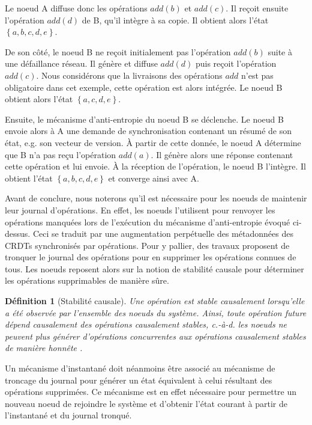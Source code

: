 \documentclass[12pt]{thesul}
\newtheorem{definition}{Définition}
\newcommand{\eg}{e.g. }
\newcommand{\ie}{c.-à-d. }
\newcommand{\trm}[1]{\mathit{#1}}
\newcommand{\set}[1]{\left\{#1\right\}} %
\begin{document}
Le noeud A diffuse donc les opérations $\trm{add}(b)$ et $\trm{add}(c)$.
Il reçoit ensuite l'opération $\trm{add}(d)$ de B, qu'il intègre à sa copie.
Il obtient alors l'état $\set{a,b,c,d,e}$.

De son côté, le noeud B ne reçoit initialement pas l'opération $\trm{add}(b)$ suite à une défaillance réseau.
Il génère et diffuse $\trm{add}(d)$ puis reçoit l'opération $\trm{add}(c)$.
Nous considérons que la livraisons des opérations $\trm{add}$ n'est pas obligatoire dans cet exemple, cette opération est alors intégrée.
Le noeud B obtient alors l'état $\set{a,c,d,e}$.

Ensuite, le mécanisme d'anti-entropie du noeud B se déclenche.
Le noeud B envoie alors à A une demande de synchronisation contenant un résumé de son état, \eg son vecteur de version.
À partir de cette donnée, le noeud A détermine que B n'a pas reçu l'opération $\trm{add}(a)$.
Il génère alors une réponse contenant cette opération et lui envoie.
À la réception de l'opération, le noeud B l'intègre.
Il obtient l'état $\set{a,b,c,d,e}$ et converge ainsi avec A.

Avant de conclure, nous noterons qu'il est nécessaire pour les noeuds de maintenir leur journal d'opérations.
En effet, les noeuds l'utilisent pour renvoyer les opérations manquées lors de l'exécution du mécanisme d'anti-entropie évoqué ci-dessus.
Ceci se traduit par une augmentation perpétuelle des métadonnées des \acp{CRDT} synchronisés par opérations.
Pour y pallier, des travaux \cite{baquero2017pure, 2021-improving-reactivity-pure-op-based-crdts-bauwens} proposent de tronquer le journal des opérations pour en supprimer les opérations connues de tous.
Les noeuds reposent alors sur la notion de stabilité causale pour déterminer les opérations supprimables de manière sûre.

\begin{definition}[Stabilité causale]
  Une opération est stable causalement lorsqu'elle a été observée par l'ensemble des noeuds du système.
  Ainsi, toute opération future dépend causalement des opérations causalement stables, \ie les noeuds ne peuvent plus générer d'opérations concurrentes aux opérations causalement stables de manière honnête .
\end{definition}

Un mécanisme d'instantané  doit néanmoins être associé au mécanisme de troncage du journal pour générer un état équivalent à celui résultant des opérations supprimées.
Ce mécanisme est en effet nécessaire pour permettre un nouveau noeud de rejoindre le système et d'obtenir l'état courant à partir de l'instantané et du journal tronqué.
\end{document}
